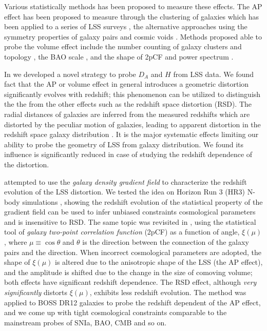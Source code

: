 \documentclass[iop]{emulateapj}
\begin{document}
Various statistically methods has been proposed to measure these effects.
The AP effect has been proposed to measure through the clustering of galaxies \citep{Ballinger1996,Matsubara1996} which has been applied to a series of LSS surveys
\citep{Outram2004,Blake2011,ChuangWang2012,Reid2012,Beutler2013,Linder2013,2014arXiv1407.2257S, Jeong2014,Sutter2014,2014ApJ...781...96L,Alam2016, Beutler2016, Sanchez2016},
the alternative approaches using the symmetry properties of galaxy pairs \citep{Marinoni2010,Jennings2011,BB2012}
and cosmic voids \citep{Ryden1995,LavausWandelt1995,Sutter2014,Qingqing2016}.
Methods proposed able to probe the volume effect include the number counting of 
galaxy clusters \citep{PS1974,VL1996} and topology \citep{topology},
the BAO scale \citep{EHT1998,BG03,SE03},
and the shape of 2pCF and power spectrum \citep{Sanchez2006,Sanchez2009}.





In \cite{Li2014,Li2015,Li2016} we developed a novel strategy to probe $D_A$ and $H$ from LSS data.
We found fact that the AP or volume effect in general introduces a geometric distortion significantly evolves with redshift;
this phenomenon can be utilized to distinguish the the from the other effects such as the redshift space distortion (RSD).
The radial distances of galaxies are inferred from the measured redshifts which are distorted by the peculiar motion of galaxies, 
leading to apparent distortion in the redshift space galaxy distribution \citep{FOG,Kaiser1987,Ballinger1996}.
It is the major systematic effects limiting our ability to probe the geometry of LSS from galaxy distribution.
We found its influence is significantly reduced in case of studying the redshift dependence of the distortion.

\cite{Li2014} attempted to use the {\it galaxy density gradient field} 
to characterize the redshift evolution of the LSS distortion. 
We tested the idea on Horizon Run 3 (HR3) N-body simulations \citep{horizonrun},
showing the redshift evolution of the statistical property of the gradient field 
can be used to infer unbiased constraints cosmological parameters and is insensitive to RSD.
The same topic was revisited in \cite{Li2015}, 
using the statistical tool of {\it galaxy two-point correlation function} (2pCF) as a function of angle, $\xi(\mu)$, 
where $\mu\equiv \cos \theta$ and $\theta$ is the direction between the connection of the galaxy pairs and the direction.
When incorrect cosmological parameters are adopted, 
the shape of $\xi(\mu)$ is altered due to the anisotropic shape of the LSS (the AP effect), 
and the amplitude is shifted due to the change in the size of comoving volume;
both effects have significant redshift dependence.
The RSD effect, although {\it very significantly} distorts $\xi(\mu)$, 
exhibits less redshift evolution.
The method was applied to BOSS DR12 galaxies \citep{Li2016} to probe the redshift dependent of the AP effect, 
and we come up with tight cosmological constraints comparable to the mainstream probes of SNIa, BAO, CMB and so on.
\end{document}
